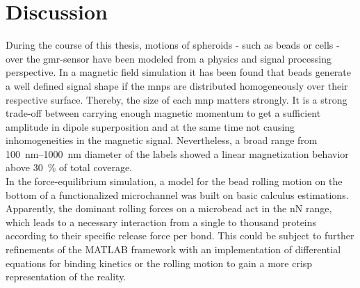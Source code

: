 \chapter{Discussion}
During the course of this thesis, motions of spheroids - such as beads or cells - over the \gls{gmr}-sensor have been modeled from a physics and signal processing perspective. In a magnetic field simulation it has been found that beads generate a well defined signal shape if the \glspl{mnp} are distributed homogeneously over their respective surface. Thereby, the size of each \gls{mnp} matters strongly. It is a strong trade-off between carrying enough magnetic momentum to get a sufficient amplitude in dipole superposition and at the same time not causing inhomogeneities in the magnetic signal. Nevertheless, a broad range from \SIrange{100}{1000}{\nano\meter} diameter of the labels showed a linear magnetization behavior above \SI{30}{\percent} of total coverage.\\
In the force-equilibrium simulation, a model for the bead rolling motion on the bottom of a functionalized microchannel was built on basic calculus estimations. Apparently, the dominant rolling forces on a microbead act in the \si{\nano\newton} range, which leads to a necessary interaction from a single to thousand proteins according to their specific release force per bond. This could be subject to further refinements of the MATLAB framework with an implementation of differential equations for binding kinetics \cite{lit:bio:BindingModeling} or the rolling motion to gain a more crisp representation of the reality. 

